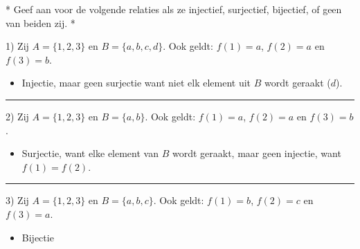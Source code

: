 \begin{niceexample}*
    Geef aan voor de volgende relaties als ze injectief, surjectief, bijectief, of geen van beiden zij.
    *

    1) Zij $A = \{1,2,3\}$ en $B = \{a,b,c,d\}$. Ook geldt: $f(1)=a$, $f(2)=a$ en $f(3)=b$.
    \begin{itemize}
        \item[\rightarrow] Injectie, maar geen surjectie want niet elk element uit $B$ wordt geraakt ($d$).
    \end{itemize}

    \vspace{0.5cm}
    \hrule
    \vspace{0.5cm}

    2) Zij $A = \{1,2,3\}$ en $B = \{a,b\}$. Ook geldt: $f(1)=a$, $f(2)=a$ en $f(3)=b$.
    \begin{itemize}
        \item[\rightarrow] Surjectie, want elke element van $B$ wordt geraakt, maar geen injectie, want $f(1) = f(2)$.
    \end{itemize}

    \vspace{0.5cm}
    \hrule
    \vspace{0.5cm}

    3) Zij $A = \{1,2,3\}$ en $B = \{a,b,c\}$. Ook geldt: $f(1)=b$, $f(2)=c$ en $f(3)=a$.
    \begin{itemize}
        \item[\rightarrow] Bijectie
    \end{itemize}
\end{niceexample}


